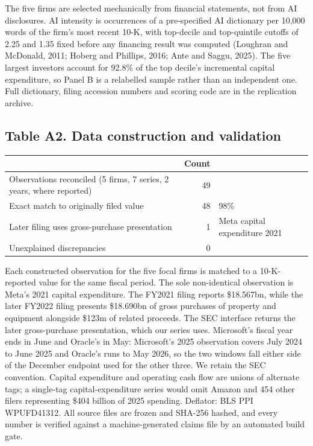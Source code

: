 \documentclass[preprint,11pt]{elsarticle}
\begin{document}
\noindent\footnotesize The five firms are selected mechanically from financial statements, not from AI disclosures. AI intensity is occurrences of a
pre-specified AI dictionary per 10{,}000 words of the firm's most recent 10-K, with top-decile and
top-quintile cutoffs of 2.25 and 1.35 fixed before any financing result was computed (Loughran and
McDonald, 2011; Hoberg and Phillips, 2016; Ante and Saggu, 2025). The five largest investors account
for 92.8\% of the top decile's incremental capital expenditure, so Panel B is a relabelled sample
rather than an independent one. Full dictionary, filing accession numbers and scoring code are in
the replication archive.\normalsize

\subsection*{Table A2. Data construction and validation}
\begin{center}\footnotesize
\begin{tabular}{@{}p{8.4cm}rl@{}}
\toprule
& Count & \\
\midrule
Observations reconciled (5 firms, 7 series, 2 years, where reported) & 49 & \\
Exact match to originally filed value & 48 & 98\% \\
Later filing uses gross-purchase presentation & 1 & Meta capital expenditure 2021 \\
Unexplained discrepancies & 0 & \\
\bottomrule
\end{tabular}\end{center}
\noindent\footnotesize Each constructed observation for the five focal firms is matched to a
10-K-reported value for the same fiscal period. The sole non-identical observation is Meta's 2021
capital expenditure. The FY2021 filing reports \$18.567bn, while the later FY2022 filing presents
\$18.690bn of gross purchases of property and equipment alongside \$123m of related proceeds. The
SEC interface returns the later gross-purchase presentation, which our series uses. Microsoft's fiscal year ends in June and Oracle's in May: Microsoft's 2025 observation covers July
2024 to June 2025 and Oracle's runs to May 2026, so the two windows fall either side of the December
endpoint used for the other three. We retain the SEC convention.
Capital expenditure and operating cash flow are unions of alternate tags; a single-tag
capital-expenditure series would omit Amazon and 454 other filers representing \$404 billion of 2025
spending. Deflator: BLS PPI WPUFD41312. All source files are frozen and
SHA-256 hashed, and every number is verified against a machine-generated claims file by an automated
build gate.\normalsize
\end{document}
